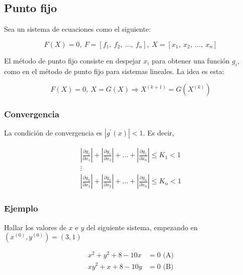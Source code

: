 \documentclass{article}
\begin{document}
\subsection{Punto fijo}

Sea un sistema de ecuaciones como el siguiente:

\begin{equation*}
    F(X) = 0,\ F = \left[f_1,\ f_2,\ \dots,\ f_n\right],\ X = \left[x_1,\ x_2,\ \dots,\ x_n\right]
\end{equation*}

El método de punto fijo consiste en despejar $x_i$ para obtener una función $g_i$, como en el método de punto fijo para sistemas lineales. La idea es esta:

\begin{equation*}
    F(X) = 0,\ X = G(X) \Longrightarrow X^{(k+1)} = G\left(X^{(k)}\right)
\end{equation*}

\subsubsection{Convergencia}

La condición de convergencia es  $\left|g^{\prime}(x)\right|<1$. Es decir,

\begin{equation*}
\begin{split}
    \left|\frac{\partial g_1}{\partial x_1}\right| + \left|\frac{\partial g_1}{\partial x_2}\right| + \dots + \left|\frac{\partial g_1}{\partial x_n}\right| \leq K_1 < 1 \\
    \vdots \\
    \left|\frac{\partial g_n}{\partial x_1}\right| + \left|\frac{\partial g_n}{\partial x_2}\right| + \dots + \left|\frac{\partial g_n}{\partial x_n}\right| \leq K_n < 1
\end{split}    
\end{equation*}

\subsubsection{Ejemplo}

Hallar los valores de $x$ e $y$ del siguiente sistema, empezando en $(x^{(0)}, y^{(0)}) = (3,1)$

\begin{align*}
    x^2 + y^2 + 8 - 10x &= 0\text{ (A)}\\
    xy^2 + x + 8 - 10y &= 0\text{ (B)}
\end{align*}
\end{document}
